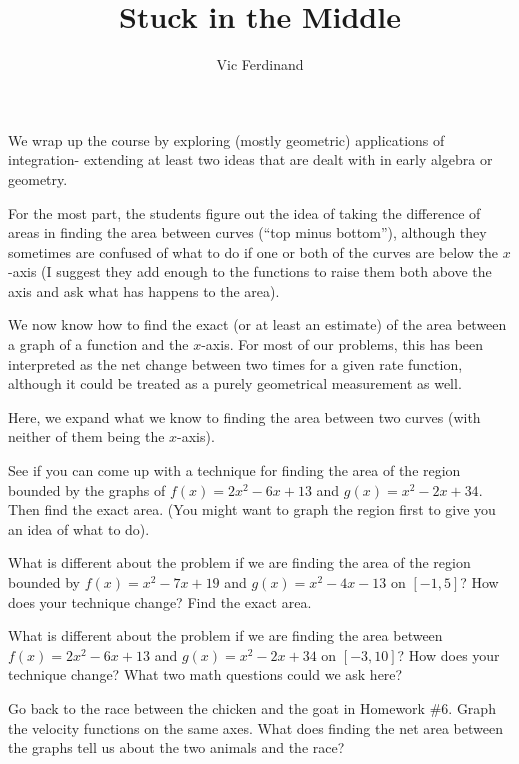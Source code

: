 \documentclass{ximera}
\author{Vic Ferdinand}
\title{Stuck in the Middle}
\begin{document}
\begin{abstract}
\end{abstract}
\maketitle

\begin{instructorIntro}
We wrap up the course by exploring (mostly geometric) applications of integration- extending at least two ideas that are dealt with in early algebra or geometry.  

For the most part, the students figure out the idea of taking the difference of areas in finding the area between curves (``top minus bottom''), although they sometimes are confused of what to do if one or both of the curves are below the $x$-axis (I suggest they add enough to the functions to raise them both above the axis and ask what has happens to the area).

\end{instructorIntro}


We now know how to find the exact (or at least an estimate) of the area between a graph of a function and the $x$-axis.  For most of our problems, this has been interpreted as the net change between two times for a given rate function, although it could be treated as a purely geometrical measurement as well.

Here, we expand what we know to finding the area between two curves (with neither of them being the $x$-axis).  

\begin{exploration} 
See if you can come up with a technique for finding the area of the region bounded by the graphs of $f(x) = 2x^2-6x+13$ and $g(x) = x^2-2x+34$.  Then find the exact area. (You might want to graph the region first to give you an idea of what to do).
\end{exploration}
\begin{exploration}
What is different about the problem if we are finding the area of the region bounded by $f(x) = x^2-7x+19$ and $g(x) = x^2-4x-13$ on $[-1, 5]$?  How does your technique change?  Find the exact area.
\end{exploration} 

\begin{exploration} 
What is different about the problem if we are finding the area between  $f(x) = 2x^2-6x+13$ and $g(x) = x^2-2x+34$ on $[-3, 10]$?  How does your technique change?   What two math questions could we ask here?
\end{exploration}
\begin{exploration} 
Go back to the race between the chicken and the goat in Homework \#6.   Graph the velocity functions on the same axes.  What does finding the net area between the graphs tell us about the two animals and the race?  
\end{exploration}
\end{document}
